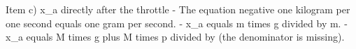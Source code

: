 Item c) x_a directly after the throttle
- The equation negative one kilogram per one second equals one gram per second.
- x_a equals m times g divided by m.
- x_a equals M times g plus M times p divided by (the denominator is missing).